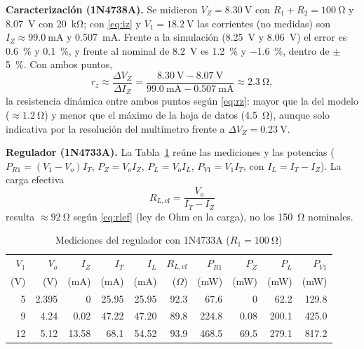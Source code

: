 \documentclass[9pt, conference]{IEEEtran}
\newcommand{\qV}[1]{\SI{#1}{\volt}}
\newcommand{\qmA}[1]{\SI{#1}{\milli\ampere}}
\newcommand{\qohm}[1]{\SI{#1}{\ohm}}
\newcommand{\qkohm}[1]{\SI{#1}{\kilo\ohm}}
\newcommand{\pct}[1]{\SI{#1}{\percent}}
\begin{document}
\textbf{Caracterización (1N4738A).} Se midieron $V_Z=\qV{8.30}$ con $R_1+R_2=\qohm{100}$ y \qV{8.07} con \qkohm{20}; con \eqref{eq:iz} y $V_1=\qV{18.2}$ las corrientes (no medidas) son $I_Z\approx\qmA{99.0}$ y \qmA{0.507}. Frente a la simulación (\qV{8.25} y \qV{8.06}) el error es \pct{+0.6} y \pct{+0.1}, y frente al nominal de \qV{8.2} es \pct{+1.2} y \pct{-1.6}, dentro de $\pm$\pct{5}. Con ambos puntos,
\begin{equation}
r_z\approx\frac{\Delta V_Z}{\Delta I_Z}=\frac{\qV{8.30}-\qV{8.07}}{\qmA{99.0}-\qmA{0.507}}\approx\qohm{2.3},
\label{eq:rz}
\end{equation}
la resistencia dinámica entre ambos puntos según \eqref{eq:rz}: mayor que la del modelo ($\approx\qohm{1.2}$) y menor que el máximo de la hoja de datos (\qohm{4.5}), aunque solo indicativa por la resolución del multímetro frente a $\Delta V_Z=\qV{0.23}$.

\textbf{Regulador (1N4733A).} La Tabla~\ref{tab:exp_z2} reúne las mediciones y las potencias ($P_{R1}=(V_1-V_o)I_T$, $P_Z=V_oI_Z$, $P_L=V_oI_L$, $P_{V1}=V_1I_T$, con $I_L=I_T-I_Z$). La carga efectiva
\begin{equation}
R_{L,\mathrm{ef}}=\frac{V_o}{I_T-I_Z}
\label{eq:rlef}
\end{equation}
resulta $\approx\qohm{92}$ según \eqref{eq:rlef} (ley de Ohm en la carga), no los \qohm{150} nominales.

\begin{table}[htbp]
\caption{Mediciones del regulador con 1N4733A ($R_1=\qohm{100}$)}
\label{tab:exp_z2}
\centering
\scriptsize
\setlength{\tabcolsep}{2pt}
\begin{tabular}{rrrrrrrrrr}
\toprule
$V_1$ & $V_o$ & $I_Z$ & $I_T$ & $I_L$ & $R_{L,\mathrm{ef}}$ & $P_{R1}$ & $P_Z$ & $P_L$ & $P_{V1}$ \\
(V) & (V) & (mA) & (mA) & (mA) & ($\Omega$) & (mW) & (mW) & (mW) & (mW) \\
\midrule
5  & 2.395 & 0     & 25.95 & 25.95 & 92.3 & 67.6  & 0    & 62.2  & 129.8 \\
9  & 4.24  & 0.02  & 47.22 & 47.20 & 89.8 & 224.8 & 0.08 & 200.1 & 425.0 \\
12 & 5.12  & 13.58 & 68.1  & 54.52 & 93.9 & 468.5 & 69.5 & 279.1 & 817.2 \\
\bottomrule
\end{tabular}
\end{table}
\end{document}
